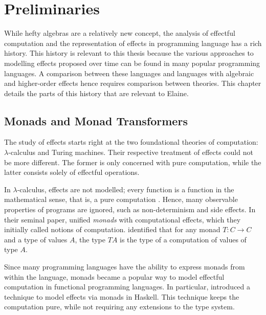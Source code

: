 \chapter{Preliminaries}\label{chap:preliminaries}

While hefty algebras are a relatively new concept, the analysis of effectful computation and the representation of effects in programming language has a rich history. This history is relevant to this thesis because the various approaches to modelling effects proposed over time can be found in many popular programming languages. A comparison between these languages and languages with algebraic and higher-order effects hence requires comparison between theories. This chapter details the parts of this history that are relevant to Elaine.

\section{Monads and Monad Transformers}

The study of effects starts right at the two foundational theories of computation: $\lambda$-calculus and Turing machines. Their respective treatment of effects could not be more different. The former is only concerned with pure computation, while the latter consists solely of effectful operations.

In $\lambda$-calculus, effects are not modelled; every function is a function in the mathematical sense, that is, a pure computation \autocite{moggi_computational_1989}. Hence, many observable properties of programs are ignored, such as non-determinism and side effects. In their seminal paper, \textcite{moggi_computational_1989} unified \emph{monads} with computational effects, which they initially called notions of computation. \citeauthor{moggi_computational_1989} identified that for any monad $T: C \to C$ and a type of values $A$, the type $T A$ is the type of a computation of values of type $A$.

Since many programming languages have the ability to express monads from within the language, monads became a popular way to model effectful computation in functional programming languages. In particular, \textcite{peyton_jones_imperative_1993} introduced a technique to model effects via monads in Haskell. This technique keeps the computation pure, while not requiring any extensions to the type system.

